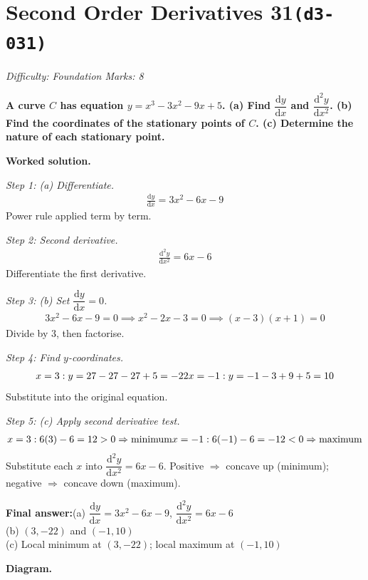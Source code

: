 \documentclass[11pt]{article}
\newcommand{\question}[1]{\par\medskip\noindent\textbf{#1}\par}
\begin{document}
\section*{Second Order Derivatives 31\quad\small\texttt{(d3-031)}}
\textit{Difficulty: Foundation \quad\textbar\quad Marks: 8}

\question{A curve \( C \) has equation \( y = x^3 - 3x^2 - 9x + 5 \). (a) Find \( \dfrac{\mathrm{d}y}{\mathrm{d}x} \) and \( \dfrac{\mathrm{d}^2y}{\mathrm{d}x^2} \). (b) Find the coordinates of the stationary points of \( C \). (c) Determine the nature of each stationary point.}

\textbf{Worked solution.}

\textit{Step 1: (a) Differentiate.}
\[\begin{gathered}
\frac{\mathrm{d}y}{\mathrm{d}x} = 3x^2 - 6x - 9
\end{gathered}\]
Power rule applied term by term.

\textit{Step 2: Second derivative.}
\[\begin{gathered}
\frac{\mathrm{d}^2y}{\mathrm{d}x^2} = 6x - 6
\end{gathered}\]
Differentiate the first derivative.

\textit{Step 3: (b) Set \( \dfrac{\mathrm{d}y}{\mathrm{d}x} = 0 \).}
\[\begin{gathered}
3x^2 - 6x - 9 = 0 \implies x^2 - 2x - 3 = 0 \implies (x-3)(x+1) = 0
\end{gathered}\]
Divide by 3, then factorise.

\textit{Step 4: Find \( y \)-coordinates.}
\[\begin{gathered}
x=3: y = 27 - 27 - 27 + 5 = -22 \newline x=-1: y = -1 - 3 + 9 + 5 = 10
\end{gathered}\]
Substitute into the original equation.

\textit{Step 5: (c) Apply second derivative test.}
\[\begin{gathered}
x=3: 6(3)-6 = 12 > 0 \Rightarrow \text{minimum} \newline x=-1: 6(-1)-6 = -12 < 0 \Rightarrow \text{maximum}
\end{gathered}\]
Substitute each \(x\) into \( \dfrac{\mathrm{d}^2y}{\mathrm{d}x^2} = 6x - 6 \). Positive \(\Rightarrow\) concave up (minimum); negative \(\Rightarrow\) concave down (maximum).

\begin{answerbox}
\textbf{Final answer:}\quad (a) \(\displaystyle  \dfrac{\mathrm{d}y}{\mathrm{d}x} = 3x^2-6x-9 \), \(\displaystyle  \dfrac{\mathrm{d}^2y}{\mathrm{d}x^2} = 6x-6 \) \\[3pt]  (b) \(\displaystyle  (3, -22) \) and \(\displaystyle  (-1, 10) \) \\[3pt]  (c) Local minimum at \(\displaystyle  (3,-22) \); local maximum at \(\displaystyle  (-1,10) \)
\end{answerbox}
\textbf{Diagram.}
\end{document}
